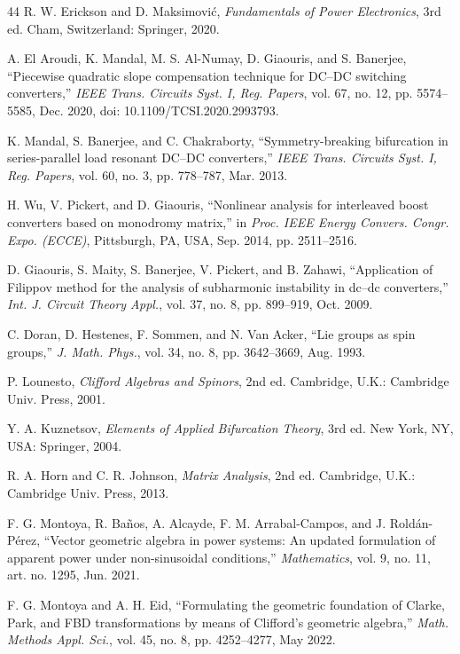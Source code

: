\documentclass[journal]{IEEEtran}
\begin{document}
\begin{thebibliography}{44}
 R. W. Erickson and D. Maksimovi\'c,
\emph{Fundamentals of Power Electronics}, 3rd ed. Cham, Switzerland:
Springer, 2020.

 A. El Aroudi, K. Mandal, M. S. Al-Numay,
D. Giaouris, and S. Banerjee, ``Piecewise quadratic slope compensation
technique for DC--DC switching converters,'' \emph{IEEE Trans. Circuits
Syst. I, Reg. Papers}, vol. 67, no. 12, pp. 5574--5585, Dec. 2020, doi:
10.1109/TCSI.2020.2993793.

 K. Mandal, S. Banerjee, and C. Chakraborty,
``Symmetry-breaking bifurcation in series-parallel load resonant DC--DC
converters,'' \emph{IEEE Trans. Circuits Syst. I, Reg. Papers}, vol. 60,
no. 3, pp. 778--787, Mar. 2013.

 H. Wu, V. Pickert, and D. Giaouris,
``Nonlinear analysis for interleaved boost converters based on monodromy
matrix,'' in \emph{Proc. IEEE Energy Convers. Congr. Expo. (ECCE)},
Pittsburgh, PA, USA, Sep. 2014, pp. 2511--2516.

 D. Giaouris, S. Maity, S. Banerjee,
V. Pickert, and B. Zahawi, ``Application of Filippov method for the analysis
of subharmonic instability in dc--dc converters,'' \emph{Int. J. Circuit
Theory Appl.}, vol. 37, no. 8, pp. 899--919, Oct. 2009.

 C. Doran, D. Hestenes, F. Sommen, and N. Van Acker,
``Lie groups as spin groups,'' \emph{J. Math. Phys.}, vol. 34, no. 8,
pp. 3642--3669, Aug. 1993.

 P. Lounesto, \emph{Clifford Algebras and Spinors},
2nd ed. Cambridge, U.K.:
Cambridge Univ. Press, 2001.

 Y. A. Kuznetsov, \emph{Elements of Applied
Bifurcation Theory}, 3rd ed. New York, NY, USA: Springer, 2004.

 R. A. Horn and C. R. Johnson, \emph{Matrix
Analysis}, 2nd ed. Cambridge, U.K.: Cambridge Univ. Press, 2013.

 F. G. Montoya, R. Ba\~nos, A. Alcayde,
F. M. Arrabal-Campos, and J. Rold\'an-P\'erez, ``Vector geometric algebra in
power systems: An updated formulation of apparent power under non-sinusoidal
conditions,'' \emph{Mathematics}, vol. 9, no. 11, art. no. 1295, Jun. 2021.

 F. G. Montoya and A. H. Eid, ``Formulating the
geometric foundation of Clarke, Park, and FBD transformations by means of
Clifford's geometric algebra,'' \emph{Math. Methods Appl. Sci.}, vol. 45,
no. 8, pp. 4252--4277, May 2022.


\end{thebibliography}
\end{document}
